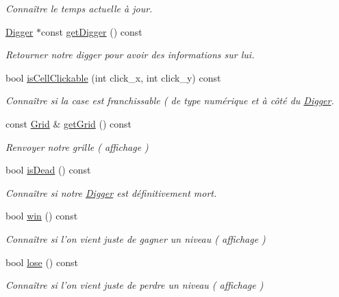 \begin{DoxyCompactItemize}
\begin{DoxyCompactList}\small\item\em Connaître le temps actuelle à jour. \end{DoxyCompactList}\item 
\hyperlink{class_digger}{Digger} $\ast$const \hyperlink{class_level_a2c53239c70b357a0a2287762e06c9182}{get\-Digger} () const 
\begin{DoxyCompactList}\small\item\em Retourner notre digger pour avoir des informations sur lui. \end{DoxyCompactList}\item 
bool \hyperlink{class_level_a8b98e1d55d50e4d8d9cba54e96b72677}{is\-Cell\-Clickable} (int click\-\_\-x, int click\-\_\-y) const 
\begin{DoxyCompactList}\small\item\em Connaître si la case est franchissable ( de type numérique et à côté du \hyperlink{class_digger}{Digger}. \end{DoxyCompactList}\item 
const \hyperlink{_level_8h_aa52f3da1e4a1cd4aecda50840fed14ff}{Grid} \& \hyperlink{class_level_a777499d0a75fde6c16507539554d47ef}{get\-Grid} () const 
\begin{DoxyCompactList}\small\item\em Renvoyer notre grille ( affichage ) \end{DoxyCompactList}\item 
bool \hyperlink{class_level_a77f7a589835b97308725fb33cce9b180}{is\-Dead} () const 
\begin{DoxyCompactList}\small\item\em Connaître si notre \hyperlink{class_digger}{Digger} est définitivement mort. \end{DoxyCompactList}\item 
bool \hyperlink{class_level_a0a925be843eb5104640f6620fc1d60de}{win} () const 
\begin{DoxyCompactList}\small\item\em Connaître si l'on vient juste de gagner un niveau ( affichage ) \end{DoxyCompactList}\item 
bool \hyperlink{class_level_a0407f9f93fcc7f4b62243f19a08a151d}{lose} () const 
\begin{DoxyCompactList}\small\item\em Connaître si l'on vient juste de perdre un niveau ( affichage ) \end{DoxyCompactList}\item 

\end{DoxyCompactItemize}
